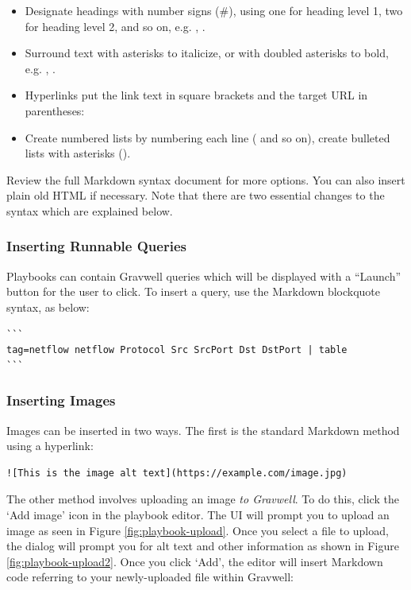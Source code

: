 \begin{itemize}
\item Designate headings with number signs (\#), using one for heading level 1, two for heading level 2, and so on, e.g. , .
\item Surround text with asterisks to italicize, or with doubled asterisks to bold, e.g. , .
\item Hyperlinks put the link text in square brackets and the target URL in parentheses: 
\item Create numbered lists by numbering each line ( and so on), create bulleted lists with asterisks ().
\end{itemize}

Review the full Markdown syntax document for more options. You can also insert plain old HTML if necessary. Note that there are two essential changes to the syntax which are explained below.

\subsubsection{Inserting Runnable Queries}

Playbooks can contain Gravwell queries which will be displayed with a ``Launch'' button for the user to click. To insert a query, use the Markdown blockquote syntax, as below:

\begin{verbatim}
```
tag=netflow netflow Protocol Src SrcPort Dst DstPort | table
```
\end{verbatim}

\subsubsection{Inserting Images}

Images can be inserted in two ways. The first is the standard Markdown method using a hyperlink:

\begin{verbatim}
![This is the image alt text](https://example.com/image.jpg)
\end{verbatim}

The other method involves uploading an image \emph{to Gravwell}. To do this, click the `Add image' icon in the playbook editor. The UI will prompt you to upload an image as seen in Figure \ref{fig:playbook-upload}. Once you select a file to upload, the dialog will prompt you for alt text and other information as shown in Figure \ref{fig:playbook-upload2}. Once you click `Add', the editor will insert Markdown code referring to your newly-uploaded file within Gravwell:

